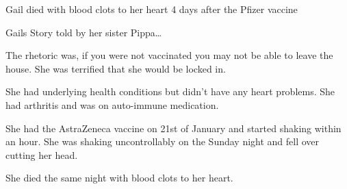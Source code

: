 Gail died with blood clots to her heart 4 days after the Pfizer vaccine

Gails Story told by her sister Pippa…

The rhetoric was, if you were not vaccinated you may not be able to leave the
house. She was terrified that she would be locked in.

She had underlying health conditions but didn’t have any heart problems. She had
arthritis and was on auto-immune medication.

She had the AstraZeneca vaccine on 21st of January and started shaking within an
hour. She was shaking uncontrollably on the Sunday night and fell over cutting
her head.

She died the same night with blood clots to her heart.

